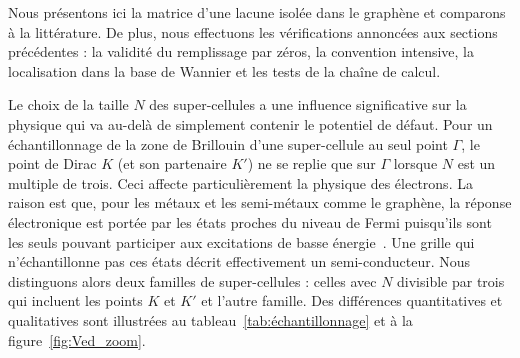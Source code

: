 Nous présentons ici la matrice d'une lacune isolée dans le graphène et comparons à la littérature. De plus, nous effectuons les vérifications annoncées aux sections précédentes : la validité du remplissage par zéros, la convention intensive, la localisation dans la base de Wannier et les tests de la chaîne de calcul.

\bigskip
{}

Le choix de la taille $N$ des super-cellules a une influence significative sur la physique qui va au-delà de simplement contenir le potentiel de défaut. Pour un échantillonnage de la zone de Brillouin d'une super-cellule au seul point $\Gamma$, le point de Dirac $K$ (et son partenaire $K'$) ne se replie que sur $\Gamma$ lorsque $N$ est un multiple de trois. Ceci affecte particulièrement la physique des électrons. La raison est que, pour les métaux et les semi-métaux comme le graphène, la réponse électronique est portée par les états proches du niveau de Fermi puisqu'ils sont les seuls pouvant participer aux excitations de basse énergie~\cite{ashcroftSolidStatePhysics1976}. Une grille qui n'échantillonne pas ces états décrit effectivement un semi-conducteur. Nous distinguons alors deux familles de super-cellules : celles avec $N$ divisible par trois qui incluent les points $K$ et $K'$ et l'autre famille. Des différences quantitatives et qualitatives sont illustrées au tableau~\ref{tab:échantillonnage} et à la figure~\ref{fig:Ved_zoom}.


